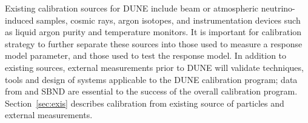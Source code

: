 Existing calibration sources for DUNE include beam or atmospheric neutrino-induced samples, cosmic rays, argon isotopes, and instrumentation devices such as liquid argon purity and temperature monitors. It is important for calibration strategy to further separate these sources into those used to measure a response model parameter, and those used to test the response model. In addition to existing sources, external measurements prior to DUNE will validate techniques, tools and design of systems applicable to the DUNE calibration program; data from   and SBND are essential to the success of the overall calibration program. %
Section~\ref{sec:exis} describes calibration from existing source of particles and external measurements.



